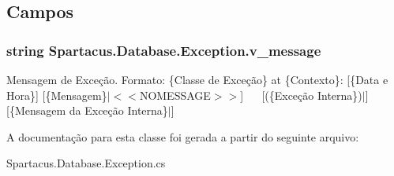 \subsection{Campos}
\hypertarget{classSpartacus_1_1Database_1_1Exception_a85a7570c692341c7442be096a9c3739a}{
\subsubsection[{v\+\_\+message}]{\setlength{\rightskip}{0pt plus 5cm}string Spartacus.\+Database.\+Exception.\+v\+\_\+message}}\label{classSpartacus_1_1Database_1_1Exception_a85a7570c692341c7442be096a9c3739a}


Mensagem de Exceção. Formato\+: \{Classe de Exceção\} at \{Contexto\}\+: \mbox{[}\{Data e Hora\}\mbox{]} \mbox{[}\{Mensagem\}$\vert$$<$$<$\+N\+O\+M\+E\+S\+S\+A\+G\+E$>$$>$\mbox{]}~\newline
~\newline
 \mbox{[}(\{Exceção Interna\})$\vert$\mbox{]} \mbox{[}\{Mensagem da Exceção Interna\}$\vert$\mbox{]} 



A documentação para esta classe foi gerada a partir do seguinte arquivo\+:\begin{DoxyCompactItemize}
\item 
Spartacus.\+Database.\+Exception.\+cs\end{DoxyCompactItemize}
